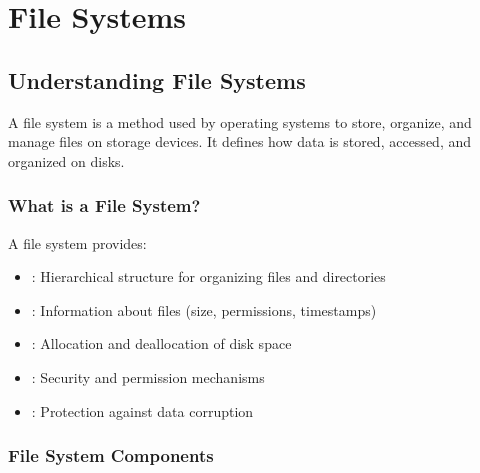 \documentclass[letterpaper,10pt,english]{sphinxmanual}
\begin{document}
\sphinxstepscope


\chapter{File Systems}
\label{\detokenize{file-systems:file-systems}}\label{\detokenize{file-systems::doc}}

\section{Understanding File Systems}
\label{\detokenize{file-systems:understanding-file-systems}}
\sphinxAtStartPar
A file system is a method used by operating systems to store, organize, and manage files on storage devices. It defines how data is stored, accessed, and organized on disks.


\subsection{What is a File System?}
\label{\detokenize{file-systems:what-is-a-file-system}}
\sphinxAtStartPar
A file system provides:
\begin{itemize}
\item {} 
\sphinxAtStartPar
{}: Hierarchical structure for organizing files and directories

\item {} 
\sphinxAtStartPar
{}: Information about files (size, permissions, timestamps)

\item {} 
\sphinxAtStartPar
{}: Allocation and deallocation of disk space

\item {} 
\sphinxAtStartPar
{}: Security and permission mechanisms

\item {} 
\sphinxAtStartPar
{}: Protection against data corruption

\end{itemize}


\subsection{File System Components}
\label{\detokenize{file-systems:file-system-components}}
\end{document}
